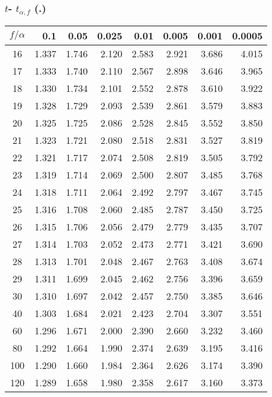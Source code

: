 \documentclass{article}
\begin{document}
{\subsubsection*{ $t$- $t_{\alpha,f}$ (.)}
\medskip
\begin{tabular}{c|*{7}{r}}
$f /\alpha$
    &   0.1  &  0.05  & 0.025  &  0.01  & 0.005  & 0.001  & 0.0005 \\\hline
 16 &  1.337 &  1.746 &  2.120 &  2.583 &  2.921 &  3.686 &  4.015 \\
 17 &  1.333 &  1.740 &  2.110 &  2.567 &  2.898 &  3.646 &  3.965 \\
 18 &  1.330 &  1.734 &  2.101 &  2.552 &  2.878 &  3.610 &  3.922 \\
 19 &  1.328 &  1.729 &  2.093 &  2.539 &  2.861 &  3.579 &  3.883 \\
 20 &  1.325 &  1.725 &  2.086 &  2.528 &  2.845 &  3.552 &  3.850 \\
 21 &  1.323 &  1.721 &  2.080 &  2.518 &  2.831 &  3.527 &  3.819 \\
 22 &  1.321 &  1.717 &  2.074 &  2.508 &  2.819 &  3.505 &  3.792 \\
 23 &  1.319 &  1.714 &  2.069 &  2.500 &  2.807 &  3.485 &  3.768 \\
 24 &  1.318 &  1.711 &  2.064 &  2.492 &  2.797 &  3.467 &  3.745 \\
 25 &  1.316 &  1.708 &  2.060 &  2.485 &  2.787 &  3.450 &  3.725 \\
 26 &  1.315 &  1.706 &  2.056 &  2.479 &  2.779 &  3.435 &  3.707 \\
 27 &  1.314 &  1.703 &  2.052 &  2.473 &  2.771 &  3.421 &  3.690 \\
 28 &  1.313 &  1.701 &  2.048 &  2.467 &  2.763 &  3.408 &  3.674 \\
 29 &  1.311 &  1.699 &  2.045 &  2.462 &  2.756 &  3.396 &  3.659 \\
 30 &  1.310 &  1.697 &  2.042 &  2.457 &  2.750 &  3.385 &  3.646 \\
 40 &  1.303 &  1.684 &  2.021 &  2.423 &  2.704 &  3.307 &  3.551 \\
 60 &  1.296 &  1.671 &  2.000 &  2.390 &  2.660 &  3.232 &  3.460 \\
 80 &  1.292 &  1.664 &  1.990 &  2.374 &  2.639 &  3.195 &  3.416 \\
100 &  1.290 &  1.660 &  1.984 &  2.364 &  2.626 &  3.174 &  3.390 \\
120 &  1.289 &  1.658 &  1.980 &  2.358 &  2.617 &  3.160 &  3.373 \\
\end{tabular}

}
\end{document}
